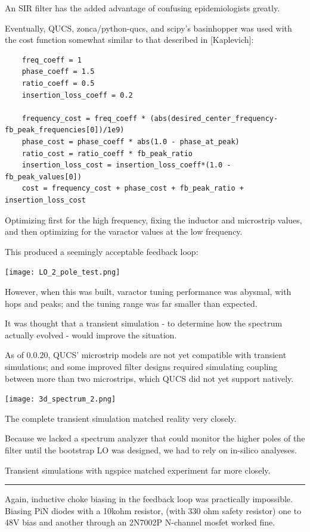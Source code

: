\documentclass[fleqn,10pt]{article}
\begin{document}
An SIR filter has the added advantage of confusing epidemiologists greatly.

Eventually, QUCS, zonca/python-qucs, and scipy's basinhopper was used with the cost function somewhat similar to that described in [Kaplevich]:

\begin{verbatim}
    freq_coeff = 1
    phase_coeff = 1.5
    ratio_coeff = 0.5
    insertion_loss_coeff = 0.2
 
    frequency_cost = freq_coeff * (abs(desired_center_frequency-fb_peak_frequencies[0])/1e9)
    phase_cost = phase_coeff * abs(1.0 - phase_at_peak)
    ratio_cost = ratio_coeff * fb_peak_ratio
    insertion_loss_cost = insertion_loss_coeff*(1.0 - fb_peak_values[0])
    cost = frequency_cost + phase_cost + fb_peak_ratio + insertion_loss_cost
\end{verbatim}

Optimizing first for the high frequency, fixing the inductor and microstrip values, and then optimizing for the varactor values at the low frequency.

This produced a seemingly acceptable feedback loop:

\texttt{[image: LO\_2\_pole\_test.png]}

However, when this was built, varactor tuning performance was abysmal, with hops and peaks; and the tuning range was far smaller than expected.

It was thought that a transient simulation - to determine how the spectrum actually evolved - would improve the situation. 

As of 0.0.20, QUCS' microstrip models are not yet compatible with transient simulations; and some improved filter designs required simulating coupling between more than two microstrips, which QUCS did not yet support natively.

\texttt{[image: 3d\_spectrum\_2.png]}

The complete transient simulation matched reality very closely. 




Because we lacked a spectrum analyzer that could monitor the higher poles of the filter until the bootstrap LO was designed, we had to rely on in-silico analyeses.


Transient simulations with ngspice matched experiment far more closely.

\rule{\linewidth}{0.2pt}

Again, inductive choke biasing in the feedback loop was practically impossible. Biasing PiN diodes with a 10kohm resistor, (with 330 ohm safety resistor) one to 48V bias and another through an 2N7002P N-channel mosfet worked fine. 
\end{document}
